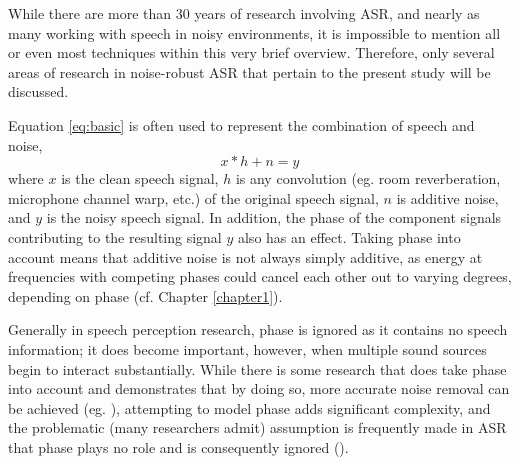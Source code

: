 While there are more than 30 years of research involving ASR, and nearly as many working with speech in noisy environments, it is impossible to mention all or even most techniques within this very brief overview.  Therefore, %
 only several areas of research in noise-robust ASR that pertain to the present study will be discussed.

Equation \ref{eq:basic} is often used to represent the combination of speech and noise,
\begin{equation}\label{eq:basic}
x * h + n = y
\end{equation}
where $x$ is the clean speech signal, $h$ is any convolution (eg. room reverberation, microphone channel warp, etc.) of the original speech signal, $n$ is additive noise, and $y$ is the noisy speech signal.  In addition, the phase of the component signals contributing to the resulting signal $y$ also has an effect.  Taking phase into account means that additive noise is not always simply additive, as energy at frequencies with competing phases could cancel each other out to varying degrees, depending on phase (cf. Chapter \ref{chapter1}).  

Generally in speech perception research, phase is ignored as it contains no speech information; it does become important, however, when multiple sound sources begin to interact substantially. While there is some research that does take phase into account and demonstrates that by doing so, more accurate noise removal can be achieved (eg. \cite{deng:04,leutnant:09}), attempting to model phase adds significant complexity, and the problematic (many researchers admit) assumption is frequently made in ASR that phase plays no role and is consequently ignored (\cite{li:14}).  

